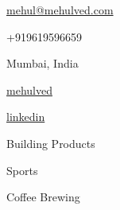 \documentclass[11pt]{spidercv}
\begin{document}
    \begin{TopBar}{\ColorTextSide}

        \begin{DoubleColumns}
            \begin{ItemList}{\ColorHighlight}
                \item [\Large\faAt] \href{mailto:mehul@mehulved.com}{mehul@mehulved.com}
                \item [\Large\faMobile] +919619596659
                \item [\Large\faMapMarker] Mumbai, India
            \end{ItemList}
            \nextcolumn
            \begin{ItemList}{\ColorHighlight}
                \item [\Large\faGithub] \href{https://github.com/mehulved}{mehulved}
                \item [\Large\faLinkedinSquare] \href{https://www.linkedin.com/mehul-ved}{linkedin}
            \end{ItemList}
        \end{DoubleColumns}

        \begin{TripleColumns}
            \begin{ItemList}{\ColorHighlight}
                \item [] Building Products
            \end{ItemList}
            \nextcolumn
            \begin{ItemList}{\ColorHighlight}
                \item [] Sports
            \end{ItemList}
            \nextcolumn
            \begin{ItemList}{\ColorHighlight}
                \item [] Coffee Brewing
            \end{ItemList}
        \end{TripleColumns}
    \end{TopBar}
\end{document}
